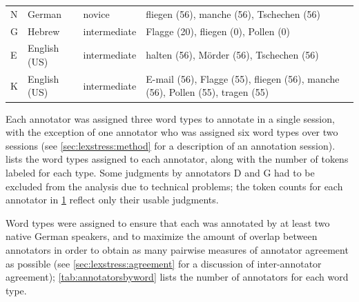 \begin{table}[htb]
\begin{tabularx}{\textwidth}{lllX}
		
		N & German	& novice & fliegen (56),  manche (56), Tschechen (56)	 \\
		
		
		
		G & Hebrew	& intermediate & Flagge (20), 	fliegen (0),  Pollen (0)	 %
		\\		

		E & English (US)	& intermediate & 	halten (56),  M\"{o}rder (56), Tschechen (56) 	 \\

		K & English (US)	& intermediate &  E-mail (56), Flagge (55),	    fliegen (56),  manche (56),   Pollen (55),   tragen (55) \\		
		



		\bottomrule
		\end{tabularx}
		\label{tab:annotators}
	\end{table}
	
	
	
	
	Each annotator was assigned three word types to annotate in a single session, with the exception of one annotator who was assigned six word types over two sessions (see \cref{sec:lexstress:method} for a description of an annotation session).  lists the word types assigned to each annotator, along with the number of tokens labeled for each type. Some judgments by annotators D and G had to be excluded from the analysis due to technical problems; the token counts for each annotator in \cref{tab:annotators} reflect only their usable judgments. 
	
	Word types were assigned to ensure that each was annotated by at least two native German speakers, and to maximize the amount of overlap between annotators in order to obtain as many pairwise measures of annotator agreement as possible (see \cref{sec:lexstress:agreement} for a discussion of inter-annotator agreement); \cref{tab:annotatorsbyword} lists the number of annotators for each word type.
	
